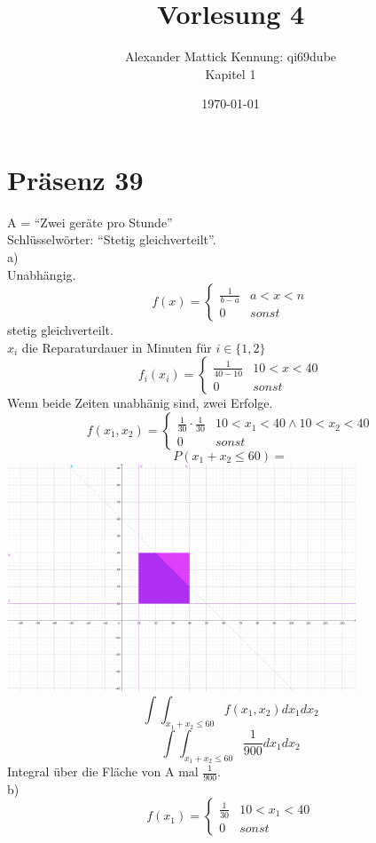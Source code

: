 \documentclass{article}
\author{
Alexander Mattick Kennung: qi69dube\\
Kapitel 1
}
\date{\today}
\title{Vorlesung 4}
\begin{document}
	\maketitle
	\section{Präsenz 39}
	A = ``Zwei geräte pro Stunde''\\
	Schlüsselwörter: ``Stetig gleichverteilt''.\\
	a)\\
	Unabhängig.\\
	\[f(x) = \begin{cases}\frac{1}{b-a}&a<x<n\\ 0&sonst\end{cases}\]
	stetig gleichverteilt.\\
	$x_i$ die Reparaturdauer in Minuten für $i\in\{1,2\}$\\
	\[f_i(x_i)= \begin{cases}\frac{1}{40-10}&10<x<40\\ 0&sonst\end{cases}\]
	Wenn beide Zeiten unabhänig sind, zwei Erfolge.\\
	\[f(x_1,x_2) =  \begin{cases}\frac{1}{30}\cdot \frac{1}{30}&10<x_1<40\land 10<x_2<40\\ 0&sonst\end{cases}\]
	\[P(x_1+x_2\leq 60)=\]
	\includegraphics[height=256px]{SkizzePräsenz.png}\\
	$$\int\int_{x_1+x_2\leq 60}f(x_1,x_2)dx_1dx_2$$
	$$\int\int_{x_1+x_2\leq 60}\frac{1}{900}dx_1dx_2$$
	Integral über die Fläche von A mal $\frac{1}{900}$.\\
	b)\\
	\[f(x_1)=\begin{cases}\frac{1}{30}&10<x_1<40\\ 0&sonst\end{cases}\]
\end{document}
